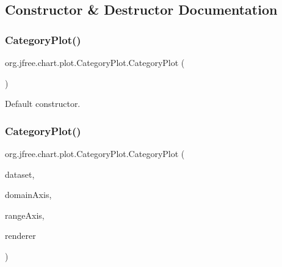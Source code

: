 \subsection{Constructor \& Destructor Documentation}
\mbox{\label{classorg_1_1jfree_1_1chart_1_1plot_1_1_category_plot_a4a33812eca739bb6a825010f98da8e66}} 
\subsubsection{\texorpdfstring{Category\+Plot()}{CategoryPlot()}\hspace{0.1cm}{\footnotesize\ttfamily [1/2]}}
{\footnotesize\ttfamily org.\+jfree.\+chart.\+plot.\+Category\+Plot.\+Category\+Plot (\begin{DoxyParamCaption}{ }\end{DoxyParamCaption})}

Default constructor. \mbox{\label{classorg_1_1jfree_1_1chart_1_1plot_1_1_category_plot_a74083ebd29e450b1edbd9facd2da9e77}} 
\subsubsection{\texorpdfstring{Category\+Plot()}{CategoryPlot()}\hspace{0.1cm}{\footnotesize\ttfamily [2/2]}}
{\footnotesize\ttfamily org.\+jfree.\+chart.\+plot.\+Category\+Plot.\+Category\+Plot (\begin{DoxyParamCaption}\item[{\mbox{\hyperlink{interfaceorg_1_1jfree_1_1data_1_1category_1_1_category_dataset}{Category\+Dataset}}}]{dataset,  }\item[{\mbox{\hyperlink{classorg_1_1jfree_1_1chart_1_1axis_1_1_category_axis}{Category\+Axis}}}]{domain\+Axis,  }\item[{\mbox{\hyperlink{classorg_1_1jfree_1_1chart_1_1axis_1_1_value_axis}{Value\+Axis}}}]{range\+Axis,  }\item[{\mbox{\hyperlink{interfaceorg_1_1jfree_1_1chart_1_1renderer_1_1category_1_1_category_item_renderer}{Category\+Item\+Renderer}}}]{renderer }\end{DoxyParamCaption})}

